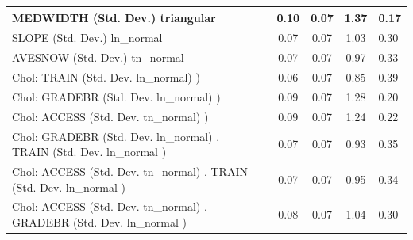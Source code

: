 \begin{table}
\begin{center}
\begin{tabular}{|l|l|c|c|c|l|}
			\hline
			MEDWIDTH (Std. Dev.) triangular &  & 0.10 & 0.07 & 1.37 & 0.17 \\
			\hline
			SLOPE (Std. Dev.) ln_normal &  & 0.07 & 0.07 & 1.03 & 0.30 \\
			\hline
			AVESNOW (Std. Dev.) tn_normal &  & 0.07 & 0.07 & 0.97 & 0.33 \\
			\hline
			 Chol: TRAIN (Std. Dev. ln_normal) ) &  & 0.06 & 0.07 & 0.85 & 0.39 \\
			\hline
			 Chol: GRADEBR (Std. Dev. ln_normal) ) &  & 0.09 & 0.07 & 1.28 & 0.20 \\
			\hline
			 Chol: ACCESS (Std. Dev. tn_normal) ) &  & 0.09 & 0.07 & 1.24 & 0.22 \\
			\hline
			 Chol: GRADEBR (Std. Dev. ln_normal) . TRAIN (Std. Dev.   ln_normal ) &  & 0.07 & 0.07 & 0.93 & 0.35 \\
			\hline
			 Chol: ACCESS (Std. Dev. tn_normal) . TRAIN (Std. Dev.   ln_normal ) &  & 0.07 & 0.07 & 0.95 & 0.34 \\
			\hline
			 Chol: ACCESS (Std. Dev. tn_normal) . GRADEBR (Std. Dev.   ln_normal ) &  & 0.08 & 0.07 & 1.04 & 0.30 \\
			\hline
		\end{tabular}
	\end{center}
\end{table}